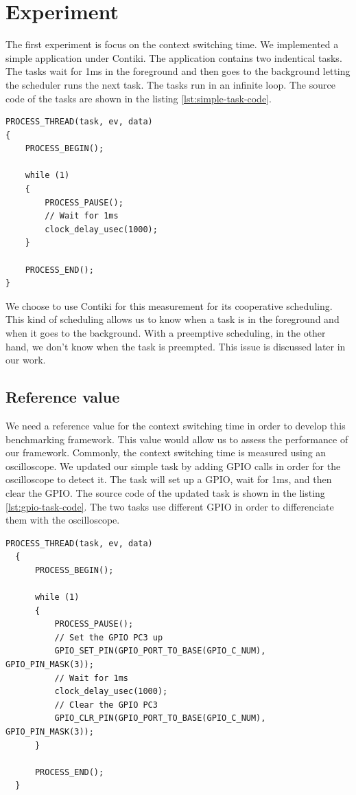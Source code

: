 \section{\label{sec:internal-experiment}Experiment}

The first experiment is focus on the context switching time.
We implemented a simple application under Contiki.
The application contains two indentical tasks.
The tasks wait for 1ms in the foreground and then goes to the background letting the scheduler runs the next task.
The tasks run in an infinite loop.
The source code of the tasks are shown in the listing \ref{lst:simple-task-code}.

\begin{lstlisting}[style=CStyle, label={lst:simple-task-code}, caption={Source code of the simple task implemented in Contiki}]
PROCESS_THREAD(task, ev, data)
{
    PROCESS_BEGIN();

    while (1)
    {
        PROCESS_PAUSE();
        // Wait for 1ms
        clock_delay_usec(1000);
    }

    PROCESS_END();
}
\end{lstlisting}


We choose to use Contiki for this measurement for its cooperative scheduling.
This kind of scheduling allows us to know when a task is in the foreground and when it goes to the background.
With a preemptive scheduling, in the other hand, we don't know when the task is preempted.
This issue is discussed later in our work.

\subsection{\label{sec:reference-value}Reference value}

We need a reference value for the context switching time in order to develop this benchmarking framework.
This value would allow us to assess the performance of our framework.
Commonly, the context switching time is measured using an oscilloscope.
We updated our simple task by adding GPIO calls in order for the oscilloscope to detect it.
The task will set up a GPIO, wait for 1ms, and then clear the GPIO.
The source code of the updated task is shown in the listing \ref{lst:gpio-task-code}.
The two tasks use different GPIO in order to differenciate them with the oscilloscope.

\begin{lstlisting}[style=CStyle, label={lst:gpio-task-code}, caption={Source code of the task with GPIO calls}]
  PROCESS_THREAD(task, ev, data)
  {
      PROCESS_BEGIN();
  
      while (1)
      {
          PROCESS_PAUSE();
          // Set the GPIO PC3 up
          GPIO_SET_PIN(GPIO_PORT_TO_BASE(GPIO_C_NUM), GPIO_PIN_MASK(3));
          // Wait for 1ms
          clock_delay_usec(1000);
          // Clear the GPIO PC3
          GPIO_CLR_PIN(GPIO_PORT_TO_BASE(GPIO_C_NUM), GPIO_PIN_MASK(3));
      }
  
      PROCESS_END();
  }
\end{lstlisting}

